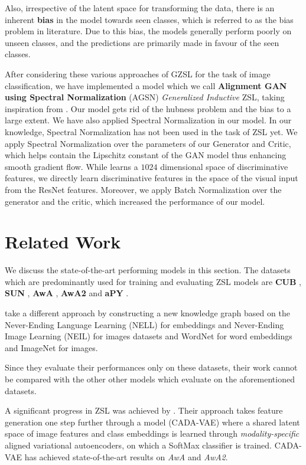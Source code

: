 \documentclass{article}
\begin{document}
Also, irrespective of the latent space for transforming the data, there is an inherent \textbf{bias} in the model towards seen classes, 
which is referred to as the bias problem in literature. 
Due to this bias, the models generally perform poorly on unseen classes, and the predictions are primarily made in favour of the seen classes.

After considering these various approaches of GZSL for the task of image classification, 
we have implemented a model which we call \textbf{Alignment GAN using Spectral Normalization} (AGSN) \textit{Generalized Inductive} ZSL, taking inspiration from \citep{akanksha}. Our model gets rid of the hubness problem and the bias to a large extent.
We have also applied Spectral Normalization \citep{spectralnorm} in our model. In our knowledge, Spectral Normalization has not been used in the task of ZSL yet. We apply Spectral Normalization over the parameters of our Generator and Critic, which helps contain the Lipschitz constant of the GAN model thus enhancing smooth gradient flow. While \citep{akanksha} learns a $1024$ dimensional space of discriminative features, we directly learn discriminative features in the space of the visual input from the ResNet features. Moreover, we apply Batch Normalization over the generator and the critic, which increased the performance of our model.


\section{Related Work}
\label{related work}
We discuss the state-of-the-art performing models in this section. 
The datasets which are predominantly used for training and evaluating ZSL models are \textbf{CUB} \citep{cub}, \textbf{SUN} \citep{sun}, \textbf{AwA} \citep{awa}, \textbf{AwA2} \citep{awa2}  and \textbf{aPY} \citep{apy}.

\citet{abhinav} take a different approach by constructing a new knowledge graph based on the Never-Ending Language Learning (NELL) for embeddings \citep{gcn3} and Never-Ending Image Learning (NEIL) for images \citep{gcn8} datasets and WordNet for word embeddings and ImageNet for images.

Since they evaluate their performances only on these datasets, their work cannot be compared with the other other models which evaluate on the aforementioned datasets.

A significant progress in ZSL was achieved by \citep{edgar}. 
Their approach takes feature generation one step further through a model (CADA-VAE)
where a shared latent space of image features and class embeddings is learned through \textit{modality-specific} aligned variational autoencoders, 
on which a SoftMax classifier is trained. CADA-VAE has achieved state-of-the-art results on \textit{AwA} and \textit{AwA2}.
\end{document}
